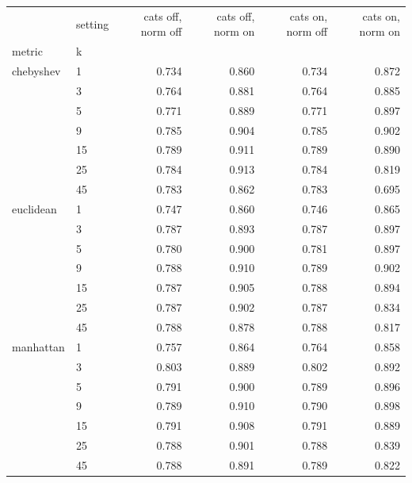 \begin{tabular}{llrrrr}
\toprule
 & setting & cats off, norm off & cats off, norm on & cats on, norm off & cats on, norm on \\
metric & k &  &  &  &  \\
\midrule
chebyshev & 1 & 0.734 & 0.860 & 0.734 & 0.872 \\
 & 3 & 0.764 & 0.881 & 0.764 & 0.885 \\
 & 5 & 0.771 & 0.889 & 0.771 & 0.897 \\
 & 9 & 0.785 & 0.904 & 0.785 & 0.902 \\
 & 15 & 0.789 & 0.911 & 0.789 & 0.890 \\
 & 25 & 0.784 & 0.913 & 0.784 & 0.819 \\
 & 45 & 0.783 & 0.862 & 0.783 & 0.695 \\
euclidean & 1 & 0.747 & 0.860 & 0.746 & 0.865 \\
 & 3 & 0.787 & 0.893 & 0.787 & 0.897 \\
 & 5 & 0.780 & 0.900 & 0.781 & 0.897 \\
 & 9 & 0.788 & 0.910 & 0.789 & 0.902 \\
 & 15 & 0.787 & 0.905 & 0.788 & 0.894 \\
 & 25 & 0.787 & 0.902 & 0.787 & 0.834 \\
 & 45 & 0.788 & 0.878 & 0.788 & 0.817 \\
manhattan & 1 & 0.757 & 0.864 & 0.764 & 0.858 \\
 & 3 & 0.803 & 0.889 & 0.802 & 0.892 \\
 & 5 & 0.791 & 0.900 & 0.789 & 0.896 \\
 & 9 & 0.789 & 0.910 & 0.790 & 0.898 \\
 & 15 & 0.791 & 0.908 & 0.791 & 0.889 \\
 & 25 & 0.788 & 0.901 & 0.788 & 0.839 \\
 & 45 & 0.788 & 0.891 & 0.789 & 0.822 \\
\bottomrule
\end{tabular}
